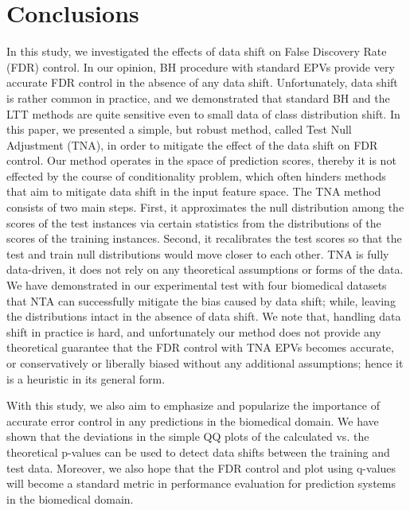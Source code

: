 \documentclass{article}
\begin{document}
\section{Conclusions}

In this study, we investigated the effects of data shift on False Discovery Rate (FDR) control. In our opinion, BH procedure with standard EPVs provide very accurate FDR control in the absence of any data shift. Unfortunately, data shift is rather common in practice, and we demonstrated that standard BH and the LTT methods are quite sensitive even to small data of class distribution shift. In this paper, we presented a simple, but robust method, called Test Null Adjustment (TNA), in order to mitigate the effect of the data shift on FDR control. Our method operates in the space of prediction scores, thereby it is not effected by the course of conditionality problem, which often hinders methods that aim to mitigate data shift in the input feature space. The TNA method consists of two main steps. First, it approximates the null distribution among the scores of the test instances via certain statistics from the distributions of the scores of the training instances. Second, it recalibrates the test scores so that the test and train null distributions would move closer to each other. TNA is fully data-driven, it does not rely on any theoretical assumptions or forms of the data. We have demonstrated in our experimental test with four biomedical datasets that NTA can successfully mitigate the bias caused by data shift; while, leaving the distributions intact in the absence of data shift. We note that, handling data shift in practice is hard, and unfortunately our method does not provide any theoretical guarantee that the FDR control with TNA EPVs becomes accurate, or conservatively or liberally biased without any additional assumptions; hence it is a heuristic in its general form.  

With this study, we also aim to emphasize and popularize the importance of accurate error control in any predictions in the biomedical domain. We have shown that the deviations in the simple QQ plots of the calculated vs. the theoretical p-values can be used to detect data shifts between the training and test data. Moreover, we also hope that the FDR control and plot using q-values will become a standard metric in performance evaluation for prediction systems in the biomedical domain.
\end{document}
